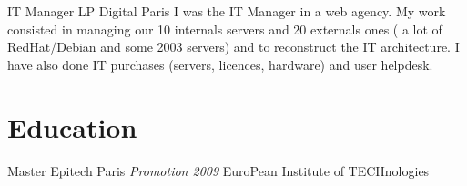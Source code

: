 \documentclass[11pt,a4paper,sans]{moderncv}
\begin{document}
{IT Manager}
{LP Digital}
{Paris}
{}
{I was the IT Manager in a web agency.\newline{}
My work consisted in managing our 10 internals servers and 20 externals ones
( a lot of RedHat/Debian and some 2003 servers) and to reconstruct the IT
architecture.
I have also done IT purchases (servers, licences, hardware) and user helpdesk.
}

\section{Education}

{Master}
{Epitech}
{Paris}
{\textit{Promotion 2009}}
{EuroPean Institute of TECHnologies}
\end{document}
